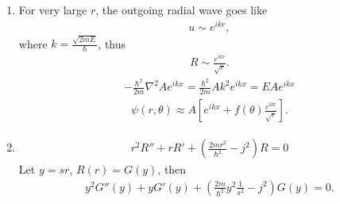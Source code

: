 \begin{enumerate}
          Let $u = \sqrt r R$,
          $R' = -\frac{1}{2}r^{-3/2}u + r^{-1/2}u'$, and
          $R'' = \frac{3}{4}r^{-5/2}u- r^{-3/2}u'  + r^{-1/2}u''$, the equation becomes
          \begin{align*}
              \frac{r^2}{R}
              \left[
                  \frac{3}{4}r^{-5/2}u- r^{-3/2}u'  + r^{-1/2}u''
                  \right]
              +\frac{r}{R}
              \left[
                  -\frac{1}{2}r^{-3/2}u + r^{-1/2}u'
                  \right]
              -\frac{2mr^2}{\hbar^2}(V-E) = j^2
          \end{align*}
          \begin{align*}
              \frac{1}{4}r^{-2}u  + u''
              -\frac{2mr^2}{\hbar^2}(V-E) u r^{-2} = j^2 u r^{-2}
          \end{align*}
          \begin{align*}
              -\frac{\hbar^2}{2m}u''
              +\left[
                   V + \frac{\hbar^2}{2m}
                   \frac{j^2-\frac{1}{4}}{r^2}
                   \right] u
              = Eu
          \end{align*}
    \item
          For very large $r$, the outgoing radial wave goes like
          \begin{align*}
              u \sim e^{ikr},
          \end{align*}
          where $k = \frac{\sqrt{2m E}}{\hbar}$, thus
          \begin{align*}
              R \sim \frac{e^{ikr}}{\sqrt{r}}.
          \end{align*}
          \begin{align*}
              -\frac{\hbar^2}{2m}\nabla^2 Ae^{ikx}
              =\frac{\hbar^2}{2m} A k^2 e^{ikx}
              =E Ae^{ikx}
          \end{align*}
          \begin{align*}
              \psi(r,\theta) \approx
              A\left[
                   e^{ikx} + f(\theta) \frac{e^{ikr}}{\sqrt{r}}
                   \right].
          \end{align*}
    \item
          \begin{align*}
              r^2R'' + rR' +( \frac{2mr^2}{\hbar^2} - j^2) R  = 0
          \end{align*}
          Let $y=sr$, $R(r) = G(y)$, then
          \begin{align*}
              y^2G''(y) + yG'(y) +( \frac{2m}{\hbar^2}y^2\frac{1}{s^2} - j^2) G(y) = 0.

\end{align*}
\end{enumerate}

